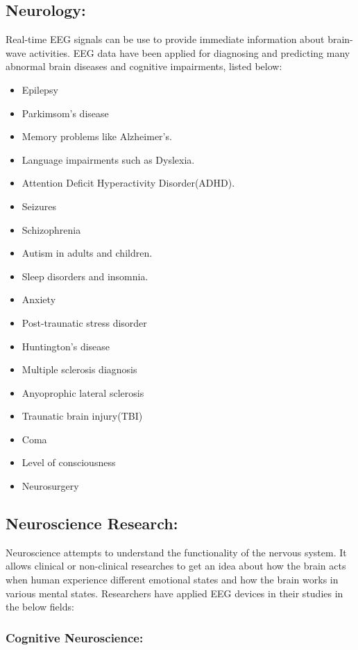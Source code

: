 \documentclass[12pt,a4paper]{article}
\begin{document}
\subsection{Neurology:}
Real-time EEG signals can be use to provide immediate information about brain-wave activities. EEG data have been applied for diagnosing and predicting many abnormal brain diseases and cognitive impairments, listed below:
\begin{itemize}
\item Epilepsy
\item Parkimsom's disease
\item Memory problems like Alzheimer's.
\item Language impairments such as Dyslexia.
\item Attention Deficit Hyperactivity Disorder(ADHD).
\item Seizures
\item Schizophrenia
\item Autism in adults and children.
\item Sleep disorders and insomnia.
\item Anxiety
\item Post-traunatic stress disorder
\item Huntington's disease
\item Multiple sclerosis diagnosis
\item Anyoprophic lateral sclerosis
\item Traunatic brain injury(TBI)
\item Coma
\item Level of consciousness
\item Neurosurgery
\end{itemize}

\subsection{Neuroscience Research:}

Neuroscience attempts to understand the functionality of the nervous system. It allows clinical or non-clinical researches to get an idea about how the brain acts when human experience different emotional states and how the brain works in various mental states. Researchers have applied EEG devices in their studies in the below fields:

\subsubsection{Cognitive Neuroscience:}
\end{document}
